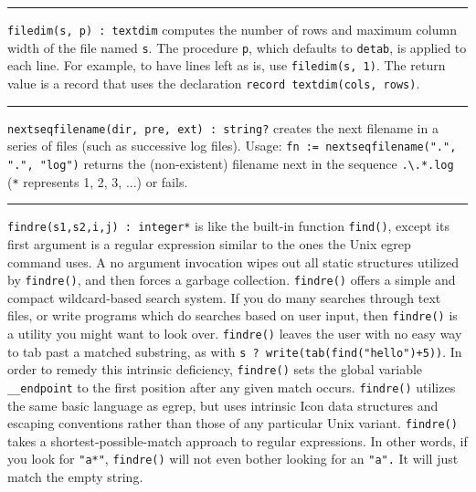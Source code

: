\vspace{0.25cm}\hrule{}

\texttt{filedim(s, p) : textdim} computes the number of rows and maximum
column width of the file named \texttt{s}. The procedure \texttt{p},
which defaults to \texttt{detab}, is applied to each line. For example,
to have lines left as is, use \texttt{filedim(s, 1)}. The return value
is a record that uses the declaration \texttt{record textdim(cols,
rows)}. 

\vspace{0.25cm}\hrule{}

\texttt{nextseqfilename(dir, pre, ext) : string?} creates the next
filename in a series of files (such as successive
log files). Usage: \texttt{fn :=
nextseqfilename(".", ".", "log")}
returns the (non-existent) filename next in the sequence
\texttt{.{\textbackslash}.*.log} (\texttt{*} represents 1, 2, 3, ...)
or fails.

\vspace{0.25cm}\hrule{}

\texttt{findre(s1,s2,i,j) : integer*} is like the built-in function
\texttt{find()}, except its first argument is a regular expression similar to the ones the Unix
egrep command uses. A no argument invocation wipes out all
static structures utilized by \texttt{findre()}, and
then forces a garbage collection.
\texttt{findre()} offers a simple and compact wildcard-based search
system. If you do many searches through text files, or write programs
which do searches based on user input, then \texttt{findre()} is a
utility you might want to look over. \texttt{findre()} leaves the user
with no easy way to tab past a matched substring, as with \texttt{s ?
write(tab(find("hello")+5))}. In order to
remedy this intrinsic deficiency, \texttt{findre()} sets the global
variable \texttt{\_\_endpoint} to the first position after any given
match occurs. \texttt{findre()} utilizes the same basic language as
egrep, but uses intrinsic Icon data structures and escaping conventions
rather than those of any particular Unix variant. \texttt{findre()}
takes a shortest-possible-match approach to regular expressions. In
other words, if you look for \texttt{"a*"},
\texttt{findre()} will not even bother looking for an
\texttt{"a"}\texttt{.} It will just match
the empty string.


